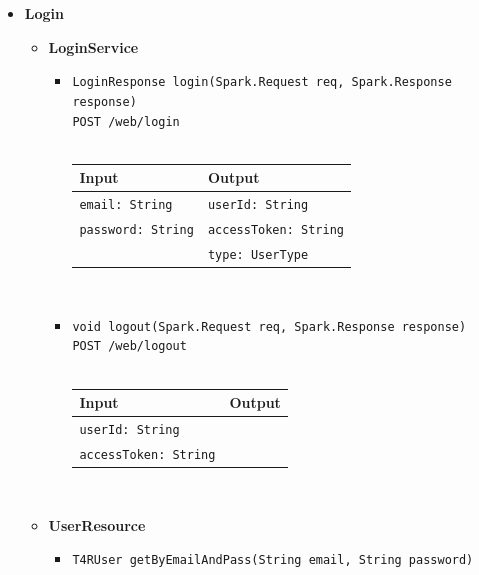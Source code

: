 \documentclass[a4paper, hidelinks, 12pt]{report}
\begin{document}
	\begin{itemize}
		\item{\textbf{Login}}
			\begin{itemize}
				\item{\textbf{LoginService}}
					\begin{itemize}
						\item{\verb|LoginResponse login(Spark.Request req, Spark.Response response)|\\ \verb|POST /web/login|}\\\\
			\begin{tabular}{l | l}
			\textbf{Input} & \textbf{Output} \\
			\hline
			\verb|email: String| & \verb|userId: String| \\
			\verb|password: String| & \verb|accessToken: String| \\
			& \verb|type: UserType| 
			\end{tabular}\\
			\item{\verb|void logout(Spark.Request req, Spark.Response response)|\\ \verb|POST /web/logout|}\\\\
			\begin{tabular}{l | l}
			\textbf{Input} & \textbf{Output} \\
			\hline
			\verb|userId: String| & \\
			\verb|accessToken: String| & \\
			\end{tabular}\\
					\end{itemize}
					
				\item{\textbf{UserResource}}
					\begin{itemize}
						\item{\verb|T4RUser getByEmailAndPass(String email, String password)|}
					\end{itemize}
			\end{itemize}
			

\end{itemize}
\end{document}
